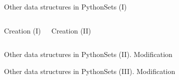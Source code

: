 \documentclass[10pt,compress]{beamer} %
\begin{document}
{\begin{frame}{Other data structures in Python}{Sets (I)}
\begin{columns}
{\begin{block}{Creation (I)}
		
		\vspace{-0.2cm}
		\end{block}
		}
		

 	  \scriptsize{
 	   \begin{block}{Creation (II)}
		\vspace{-0.2cm}
		
		
		\vspace{-0.2cm}
		
		\end{block}
		\vspace{0.3cm}
		}
	\end{columns}
\end{frame}

	

%		

\begin{frame}{Other data structures in Python}{Sets (II). Modification}
 	  
 	   \tiny{
		\begin{block}{}
		
		\vspace{-0.2cm}
		
		\vspace{-0.2cm}
		
		\end{block}
   }
\end{frame}

\begin{frame}[plain]{Other data structures in Python}{Sets (III). Modification}
 	\vspace{-0.24cm}  
 	   \tiny{
		\begin{block}{}
		
		\vspace{-0.2cm}
		
		\vspace{-0.2cm}
		
		\end{block}
   }


\end{frame}}
\end{document}
